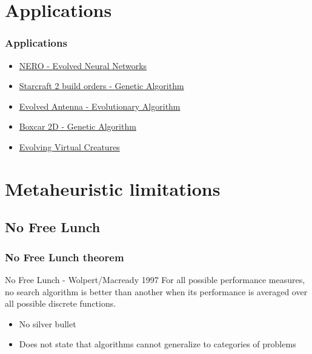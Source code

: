 \documentclass{beamer}
\begin{document}
\section{Applications}
\begin{frame}
\frametitle{Applications}

\begin{itemize}
	\item \href{http://nn.cs.utexas.edu/nero/gallery.php}{NERO - Evolved Neural Networks}
	\item \href{http://www.rockpapershotgun.com/2010/11/02/genetic-algorithms-find-build-order-from-hell}{Starcraft 2 build orders - Genetic Algorithm}
	\item \href{http://en.wikipedia.org/wiki/Evolved_antenna}{Evolved Antenna - Evolutionary Algorithm}
	\item \href{http://boxcar2d.com/index.html}{Boxcar 2D - Genetic Algorithm}
	\item \href{https://www.youtube.com/watch?v=bBt0imn77Zg}{Evolving Virtual Creatures}
\end{itemize}

\end{frame}

\section{Metaheuristic limitations}

\subsection{No Free Lunch}
\begin{frame}
\frametitle{No Free Lunch theorem}
\begin{block}{No Free Lunch - Wolpert/Macready 1997}
For all possible performance measures, no search algorithm is better than another when its performance is averaged over all possible discrete functions.
\end{block}

\textbf{}
\begin{itemize}
\item No silver bullet
\item Does not state that algorithms cannot generalize to categories of problems
\end{itemize}

\end{frame}
\end{document}
